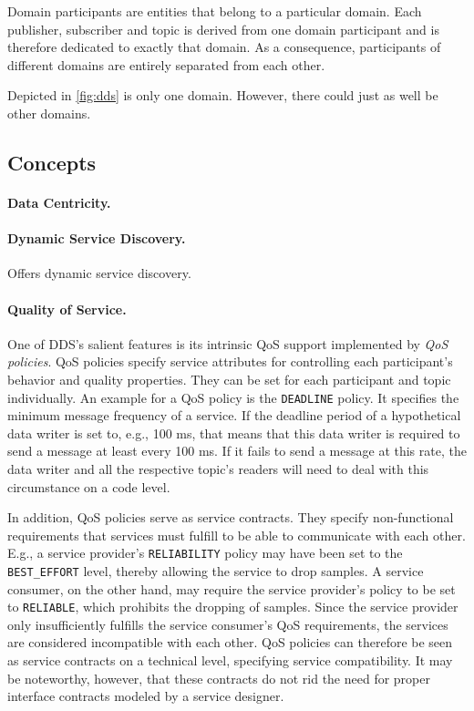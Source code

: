 Domain participants are entities that belong to a particular domain. Each publisher, subscriber and topic is derived from one domain participant and is therefore dedicated to exactly that domain. As a consequence, participants of different domains are entirely separated from each other.   

Depicted in \autoref{fig:dds} is only one domain. However, there could just as well be other domains. 



\subsection{Concepts}

\paragraph{Data Centricity.}


\paragraph{Dynamic Service Discovery.}
Offers dynamic service discovery.


\paragraph{Quality of Service.}
One of DDS's salient features is its intrinsic QoS support implemented by \emph{QoS policies}.
QoS policies specify service attributes for controlling each participant's behavior and quality properties. They can be set for each participant and topic individually. An example for a QoS policy is the \texttt{DEADLINE} policy. It specifies the minimum message frequency of a service. If the deadline period of a hypothetical data writer is set to, e.g., 100 ms, that means that this data writer is required to send a message at least every 100 ms. If it fails to send a message at this rate, the data writer and all the respective topic's readers will need to deal with this circumstance on a code level. 

In addition, QoS policies serve as service contracts. They specify non-functional requirements that services must fulfill to be able to communicate with each other. E.g., a service provider's \texttt{RELIABILITY} policy may have been set to the \texttt{BEST\_EFFORT} level, thereby allowing the service to drop samples. A service consumer, on the other hand, may require the service provider's policy to be set to \texttt{RELIABLE}, which prohibits the dropping of samples. Since the service provider only insufficiently fulfills the service consumer's QoS requirements, the services are considered incompatible with each other. QoS policies can therefore be seen as service contracts on a technical level, specifying service compatibility. It may be noteworthy, however, that these contracts do not rid the need for proper interface contracts modeled by a service designer.

